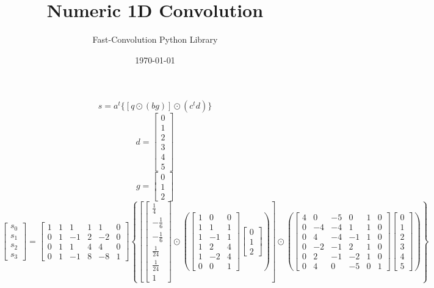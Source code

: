 \documentclass{article}%
\title{Numeric 1D Convolution}%
\author{Fast{-}Convolution Python Library}%
\date{\today}%
\begin{document}
%
\normalsize%
\maketitle%
\[%
s = a^t \{[q \odot (bg)] \odot (c^t d)\}%
\]%
\[%
d = \left[\begin{matrix}0\\1\\2\\3\\4\\5\end{matrix}\right]%
\]%
\[%
g = \left[\begin{matrix}0\\1\\2\end{matrix}\right]%
\]%
\[%
\left[\begin{matrix}s_{0}\\s_{1}\\s_{2}\\s_{3}\end{matrix}\right] = \left[\begin{matrix}1 & 1 & 1 & 1 & 1 & 0\\0 & 1 & -1 & 2 & -2 & 0\\0 & 1 & 1 & 4 & 4 & 0\\0 & 1 & -1 & 8 & -8 & 1\end{matrix}\right] \left\{ \left[ \left[\begin{matrix}\frac{1}{4}\\- \frac{1}{6}\\- \frac{1}{6}\\\frac{1}{24}\\\frac{1}{24}\\1\end{matrix}\right] \odot \left( \left[\begin{matrix}1 & 0 & 0\\1 & 1 & 1\\1 & -1 & 1\\1 & 2 & 4\\1 & -2 & 4\\0 & 0 & 1\end{matrix}\right] \left[\begin{matrix}0\\1\\2\end{matrix}\right] \right) \right] \odot \left( \left[\begin{matrix}4 & 0 & -5 & 0 & 1 & 0\\0 & -4 & -4 & 1 & 1 & 0\\0 & 4 & -4 & -1 & 1 & 0\\0 & -2 & -1 & 2 & 1 & 0\\0 & 2 & -1 & -2 & 1 & 0\\0 & 4 & 0 & -5 & 0 & 1\end{matrix}\right] \left[\begin{matrix}0\\1\\2\\3\\4\\5\end{matrix}\right] \right) \right\}%
\]%
\end{document}
